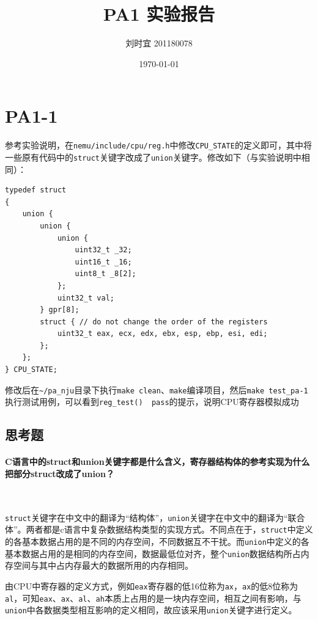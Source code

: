 \documentclass[UTF8]{ctexart}
\title{\textbf{PA1 实验报告}}
\author{刘时宜 201180078}
\date{\today}
\begin{document}
\maketitle
\tableofcontents

\section{PA1-1}
参考实验说明，在\verb|nemu/include/cpu/reg.h|中修改\verb|CPU_STATE|的定义即可，其中将一些原有代码中的\verb|struct|关键字改成了\verb|union|关键字。修改如下（与实验说明中相同）：

\lstset{language=C}
\begin{lstlisting}[style=CStyle]
typedef struct 
{
    union {
        union {
            union {
                uint32_t _32;
                uint16_t _16;
                uint8_t _8[2];
            };
            uint32_t val;
        } gpr[8];
        struct { // do not change the order of the registers
            uint32_t eax, ecx, edx, ebx, esp, ebp, esi, edi;
        };
    };
} CPU_STATE;
\end{lstlisting}

修改后在\verb|~/pa_nju|目录下执行\verb|make clean|、\verb|make|编译项目，然后\verb|make test_pa-1|执行测试用例，可以看到\verb|reg_test()  pass|的提示，说明CPU寄存器模拟成功

\subsection{思考题}
\paragraph{C语言中的struct和union关键字都是什么含义，寄存器结构体的参考实现为什么把部分struct改成了union？}~
\par \verb|struct|关键字在中文中的翻译为“结构体”，\verb|union|关键字在中文中的翻译为“联合体”。两者都是c语言中复杂数据结构类型的实现方式。不同点在于，\verb|struct|中定义的各基本数据占用的是不同的内存空间，不同数据互不干扰。而\verb|union|中定义的各基本数据占用的是相同的内存空间，数据最低位对齐，整个\verb|union|数据结构所占内存空间与其中占内存最大的数据所用的内存相同。
\par 由CPU中寄存器的定义方式，例如\verb|eax|寄存器的低16位称为\verb|ax|，\verb|ax|的低8位称为\verb|al|，可知\verb|eax|、\verb|ax|、\verb|al|、\verb|ah|本质上占用的是一块内存空间，相互之间有影响，与\verb|union|中各数据类型相互影响的定义相同，故应该采用\verb|union|关键字进行定义。
\end{document}
